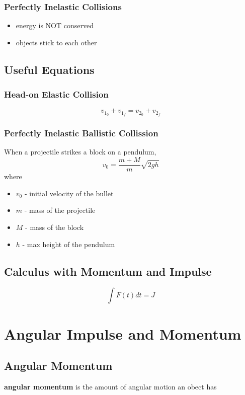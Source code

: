 \documentclass[titlepage]{article}
\begin{document}
\subsubsection{Perfectly Inelastic Collisions}
\begin{itemize}
    \item energy is NOT conserved
    \item objects stick to each other
\end{itemize}

\subsection{Useful Equations}
\subsubsection{Head-on Elastic Collision}
\begin{equation*}
    v_{1_0} + v_{1_f} = v_{2_0} + v_{2_f}
\end{equation*}

\subsubsection{Perfectly Inelastic Ballistic Collission}
When a projectile strikes a block on a pendulum,
\begin{equation*}
    v_0 = \frac{m + M}{m}\sqrt{2gh}
\end{equation*}
where
\begin{itemize}
    \item $v_0$ - initial velocity of the bullet
    \item $m$ - mass of the projectile
    \item $M$ - mass of the block
    \item $h$ - max height of the pendulum
\end{itemize}

\subsection{Calculus with Momentum and Impulse}
\begin{equation*}
    \int F(t) dt = J
\end{equation*}

\section{Angular Impulse and Momentum}
\subsection{Angular Momentum}
\textbf{angular momentum} is the amount of angular motion an obect has
\end{document}
